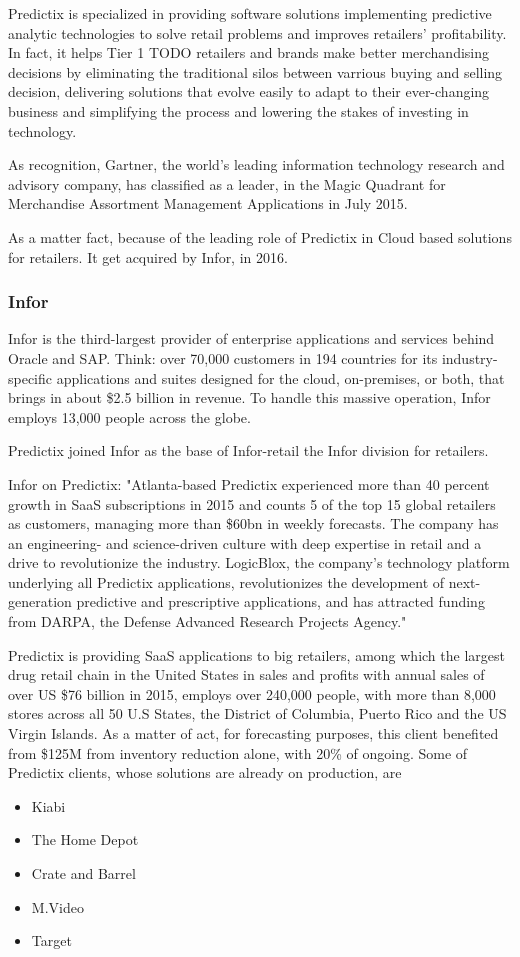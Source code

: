 Predictix is specialized in providing software solutions implementing predictive
analytic technologies to solve retail problems and improves retailers'
profitability. In fact, it helps Tier 1 TODO retailers and brands make better
merchandising decisions  by eliminating the traditional silos between varrious
buying and selling decision, delivering solutions that evolve easily to adapt to
their ever-changing business and simplifying the process and lowering the stakes
of investing in technology.

As recognition, Gartner, the world's leading information technology research and
advisory company, has classified as a leader, in the Magic Quadrant for
Merchandise Assortment Management Applications in July 2015.

As a matter fact, because of the leading role of Predictix in Cloud based
solutions for retailers. It get acquired by Infor, in 2016.

\subsubsection{Infor}
Infor is the third-largest provider of enterprise applications and services
behind Oracle and SAP. Think: over 70,000 customers in 194 countries for its
industry-specific applications and suites designed for the cloud, on-premises,
or both, that brings in about \$2.5 billion in revenue. To handle this massive
operation, Infor employs 13,000 people across the globe.

Predictix joined Infor as the base of Infor-retail the Infor division for
retailers.

Infor on Predictix:
"Atlanta-based Predictix experienced more than 40 percent growth in SaaS
subscriptions in 2015 and counts 5 of the top 15 global retailers as customers,
managing more than \$60bn in weekly forecasts. The company has an engineering-
and science-driven culture with deep expertise in retail and a drive to
revolutionize the industry. LogicBlox, the company's technology platform
underlying all Predictix applications, revolutionizes the development of
next-generation predictive and prescriptive applications, and has attracted
funding from DARPA, the Defense Advanced Research Projects Agency."

Predictix is providing SaaS applications to big retailers, among which the
largest drug retail chain in the United States in sales and profits with annual
sales of over US \$76 billion in 2015, employs over 240,000 people, with more
than 8,000 stores  across all 50 U.S States, the District of Columbia, Puerto
Rico and the US Virgin Islands. As a matter of act, for forecasting purposes,
this client benefited from \$125M from inventory reduction alone, with 20\% of
ongoing. Some of Predictix clients, whose solutions are already on production,
are
\begin{itemize}
\item{Kiabi}
\item{The Home Depot}
\item{Crate and Barrel}
\item{M.Video}
\item{Target}
\end{itemize}

